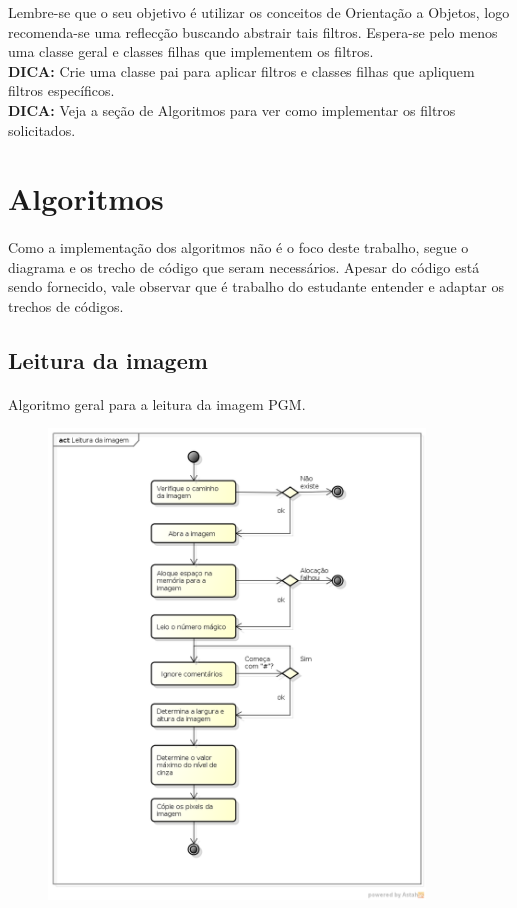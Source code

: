 \documentclass[a4paper,10pt]{article}
\begin{document}
Lembre-se que o seu objetivo é utilizar os conceitos de Orientação a Objetos, 
logo recomenda-se uma reflecção buscando abstrair tais filtros. Espera-se pelo
menos uma classe geral e classes filhas que implementem os filtros.
\\
\textbf{DICA:} Crie uma classe pai para aplicar filtros e classes filhas
que apliquem filtros específicos.\\
\textbf{DICA:} Veja a seção de Algoritmos para ver como implementar os filtros
solicitados.

\newpage
\section{Algoritmos}

\paragraph{}
Como a implementação dos algoritmos não é o foco deste trabalho, segue o
diagrama e os trecho de código que seram necessários. Apesar do código está 
sendo fornecido, vale observar que é trabalho do estudante entender e adaptar 
os trechos de códigos.

\subsection{Leitura da imagem}

\paragraph{}
Algoritmo geral para a leitura da imagem PGM.

\begin{figure}[ht]
 \center
 \includegraphics[width=10cm]{imagem/Leitura_da_imagem.png}
\end{figure}
\end{document}
